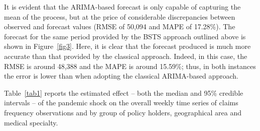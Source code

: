 \documentclass[]{risa}
\begin{document}
It is evident that the ARIMA-based forecast is only capable of capturing the mean of the process, but at the price of considerable discrepancies between observed and forecast values (RMSE of 50,094 and MAPE of 17.28\%). The forecast for the same period provided by the BSTS approach outlined above is shown in Figure~\ref{fig3}. Here, it is clear that the forecast produced is much more accurate than that provided by the classical approach. Indeed, in this case, the RMSE is around 48,388 and the MAPE is around 15.59\%; thus, in both instances the error is lower than when adopting the classical ARIMA-based approach.



Table~\ref{tab1} reports the estimated effect – both the median and 95\% credible intervals – of the pandemic shock on the overall weekly time series of claims frequency observations and by group of policy holders, geographical area and medical specialty.
\end{document}
